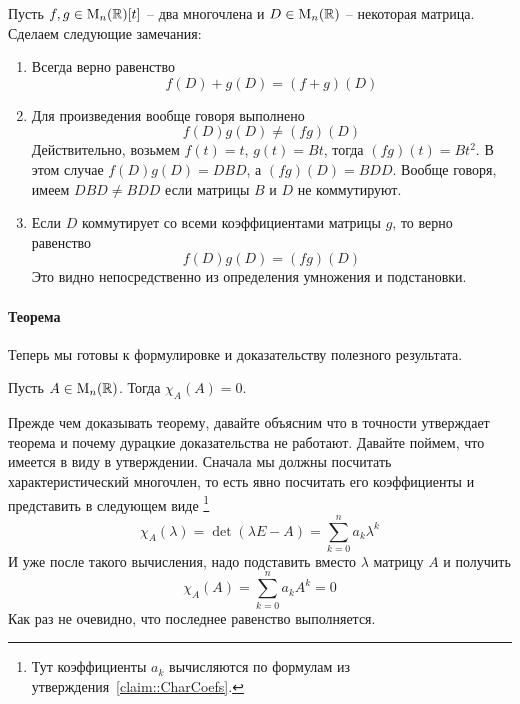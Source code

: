 Пусть $f,g\in\operatorname{M}_{n}(\mathbb R)[t]$ -- два многочлена и $D\in\operatorname{M}_{n}(\mathbb R)$ -- некоторая матрица.
Сделаем следующие замечания:
\begin{enumerate}
\item Всегда верно равенство
\[
f(D) + g(D) = (f + g)(D)
\]

\item Для произведения вообще говоря выполнено
\[
f(D)g(D)\neq (fg)(D)
\]
Действительно, возьмем $f(t) = t$, $g(t) = Bt$, тогда $(fg)(t) = Bt^2$.
В этом случае $f(D)g(D) = DBD$, а $(fg)(D) = BDD$.
Вообще говоря, имеем $DBD \neq BDD$ если матрицы $B$ и $D$ не коммутируют.

\item Если $D$ коммутирует со всеми коэффициентами матрицы $g$, то верно равенство
\[
f(D)g(D) = (fg)(D)
\]
Это видно непосредственно из определения умножения и подстановки.
\end{enumerate}

\paragraph{Теорема}

Теперь мы готовы к формулировке и доказательству полезного результата.

\begin{claim}
Пусть $A\in\operatorname{M}_{n}(\mathbb R)$.
Тогда $\chi_A(A) = 0$.
\end{claim}

Прежде чем доказывать теорему, давайте объясним что в точности утверждает теорема и почему дурацкие доказательства не работают.
Давайте поймем, что имеется в виду в утверждении.
Сначала мы должны посчитать характеристический многочлен, то есть явно посчитать его коэффициенты и представить в следующем виде%
\footnote{Тут коэффициенты $a_k$ вычисляются по формулам из утверждения~\ref{claim::CharCoefs}.}
\[
\chi_A(\lambda ) = \det(\lambda E - A) = \sum_{k=0}^n a_k \lambda ^k
\]
И уже после такого вычисления, надо подставить вместо $\lambda$ матрицу $A$ и получить
\[
\chi_A(A) = \sum_{k=0}^n a_k A^k = 0
\]
Как раз не очевидно, что последнее равенство выполняется.

